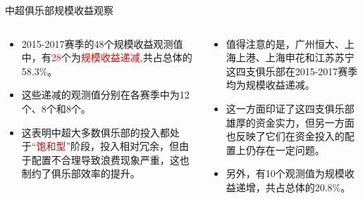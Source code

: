 \documentclass[]{beamer}
\begin{document}
\begin{frame}{中超俱乐部规模收益观察}
\begin{columns}
    \begin{column}{0.5\textwidth}
    \begin{itemize}
        \item 2015-2017赛季的48个规模收益观测值中，有\textcolor{red}{28}个为\textcolor{red}{规模收益递减},共占总体的58.3\%。
        \item 这些递减的观测值分别在各赛季中为12个、8个和8个。
        \item 这表明中超大多数俱乐部的投入都处于“\textcolor{red}{饱和型}”阶段，投入相对冗余，但由于配置不合理导致浪费现象严重，这也制约了俱乐部效率的提升。
    \end{itemize}
    \end{column}
    \begin{column}{0.5\textwidth}
    \begin{itemize}
        \item 值得注意的是，广州恒大、上海上港、上海申花和江苏苏宁这四支俱乐部在2015-2017赛季均为规模收益递减。
        \item 这一方面印证了这四支俱乐部雄厚的资金实力，但另一方面也反映了它们在资金投入的配置上仍存在一定问题。
        \item 另外，有10个观测值为规模收益递增，共占总体的20.8\%。
    \end{itemize}
    \end{column}
\end{columns}
\end{frame}

\end{document}

